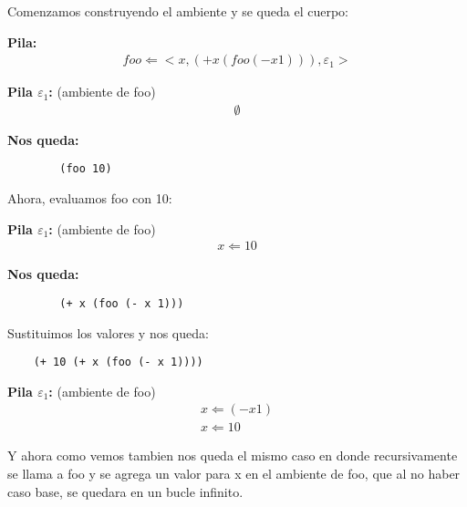 Comenzamos construyendo el ambiente y se queda el cuerpo: \vspace{.3cm}

\textbf{Pila:}
\[
\begin{array}{c}
  foo \Leftarrow <x,(+ x (foo (- x 1))),\varepsilon_1>
\end{array}
\]

\textbf{Pila $\varepsilon_1$:} (ambiente de foo)
\[
\begin{array}{c}
    \emptyset 
\end{array}
\]

\textbf{Nos queda:}
\begin{verbatim}
        (foo 10)
\end{verbatim}

Ahora, evaluamos foo con 10: \vspace{.3cm}

\textbf{Pila $\varepsilon_1$:} (ambiente de foo)
\[
\begin{array}{c}
    x \Leftarrow 10
\end{array}
\]

\textbf{Nos queda:}
\begin{verbatim}
        (+ x (foo (- x 1)))
\end{verbatim}

Sustituimos los valores y nos queda: \vspace{.3cm}
\begin{verbatim}
    (+ 10 (+ x (foo (- x 1))))
\end{verbatim}

\textbf{Pila $\varepsilon_1$:} (ambiente de foo)
\[
\begin{array}{c} 
    x \Leftarrow (- x 1) \\
    x \Leftarrow 10
\end{array}
\]

Y ahora como vemos tambien nos queda el mismo caso en donde recursivamente se llama a foo 
y se agrega un valor para x en el ambiente de foo, que al no haber caso base, se quedara en un bucle infinito.